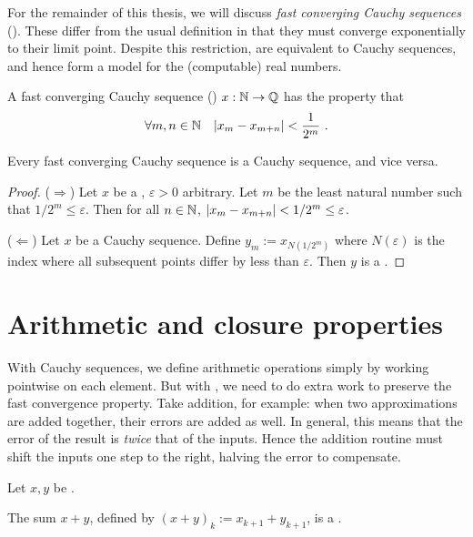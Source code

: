 \documentclass[leqno]{report}
\begin{document}
For the remainder of this thesis, we will discuss \textit{fast converging Cauchy sequences} (\FCCS). These differ from the usual definition in that they must converge exponentially to their limit point. Despite this restriction, \FCCS{} are equivalent to Cauchy sequences, and hence form a model for the (computable) real numbers.

\begin{Definition}
    A fast converging Cauchy sequence (\FCCS) $x : \mathbb{N} \rightarrow \mathbb{Q}$ has the property that
    \[ \forall {m, n \in \mathbb{N}} \quad { \left| x_m - x_{m+n} \right| < \frac{1}{2^m} } \ . \]
\end{Definition}

\begin{Proposition}
    Every fast converging Cauchy sequence is a Cauchy sequence, and vice versa.
\end{Proposition}

\begin{proof}
    ($\Rightarrow$) Let $x$ be a \FCCS, $\varepsilon > 0$ arbitrary. Let $m$ be the least natural number such that $1/2^m \leq \varepsilon$. Then for all $n \in \mathbb{N}$, $\left| x_m - x_{m+n} \right| < 1/2^m \leq \varepsilon$.

    ($\Leftarrow$) Let $x$ be a Cauchy sequence. Define $y_m := x_{N(1/2^m)}$ where $N(\varepsilon)$ is the index where all subsequent points differ by less than $\varepsilon$. Then $y$ is a \FCCS.
\end{proof}

\section{Arithmetic and closure properties}

With Cauchy sequences, we define arithmetic operations simply by working pointwise on each element. But with \FCCS, we need to do extra work to preserve the fast convergence property. Take addition, for example: when two approximations are added together, their errors are added as well. In general, this means that the error of the result is \textit{twice} that of the inputs. Hence the addition routine must shift the inputs one step to the right, halving the error to compensate.

\begin{Proposition}[Addition]
    \label{add}
    Let $x, y$ be \FCCS.

    The sum $x + y$, defined by $(x+y)_k := x_{k+1} + y_{k+1}$, is a \FCCS.
\end{Proposition}
\end{document}
